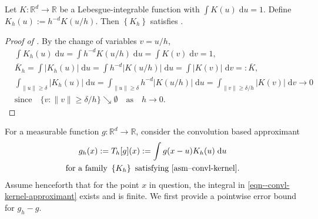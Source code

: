 \begin{theorem}
\label{lem--convl-kernel-eg}
Let \(K : \mathbb{R}^{d} \to \mathbb{R}\) be a Lebesgue-integrable function with
\(\int K (u) \; \mathrm{d} u = 1\).
Define \(K_{h} (u) := h^{- d} K (u / h)\).
Then \(\left\{ K_{h} \right\}\) satisfies .
\end{theorem}

\begin{proof}[Proof of ]
By the change of variables \(v = u / h\),
\begin{align*}
  & \int K_{h} (u) \; \mathrm{d} u = \int h^{- d} K (u / h) \; \mathrm{d} u =
  \int K (v) \; \mathrm{d} v = 1, \\
  & \overline{K}_{h} = \int \left| K_{h} (u) \right| \; \mathrm{d} u = \int h^{-
  d} |K (u / h)| \; \mathrm{d} u = \int |K (v)| \; \mathrm{d} v =: \overline{K},
  \\
  & \int_{\|u\| \geq \delta} \left| K_{h} (u) \right| \; \mathrm{d} u =
  \int_{\|u\| \geq \delta} h^{- d} \left| K (u / h) \right| \; \mathrm{d} u =
  \int_{\|v\| \geq \delta / h} |K (v)| \; \mathrm{d} v \to 0 \\
  & \text{since} \quad \{v : \|v\| \geq \delta / h\} \searrow \emptyset \quad
  \text{as} \quad h \to 0.
\end{align*}
\end{proof}

For a measurable function \(g : \mathbb{R}^{d} \to \mathbb{R}\),
consider the convolution based approximant
\begin{equation}
  \begin{gathered}
  g_{h} (x) := T_{h} [g] (x) := \int g (x - u) K_{h} (u) \; \mathrm{d} u \\
  \text{for a family } \left\{ K_{h} \right\} \text{ satisfying
  \Cref{asm--convl-kernel}.}
  \end{gathered}
  \label{eqn--convl-kernel-approximant}
\end{equation}
Assume henceforth that for the point \(x\) in question, the integral in
\eqref{eqn--convl-kernel-approximant} exists and is finite.
We first provide a pointwise error bound for \(g_{h} - g\).

